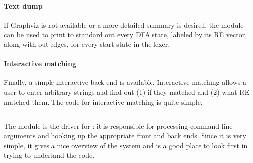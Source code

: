 \paragraph{Text dump}

If Graphviz is not available or a more detailed summary is desired, the
 module can be used to print to standard out every DFA state,
labeled by its RE vector, along with out-edges, for every start state in the
lexer.

\paragraph{Interactive matching}

Finally, a simple interactive back end is available.  Interactive matching
allows a user to enter arbitrary strings and find out (1) if they matched and
(2) what RE matched them.  The code for interactive matching is quite simple.

\subsection{}

The  module is the driver for \flex{}: it is responsible for processing
command-line arguments and hooking up the appropriate front and back ends. 
Since it is very simple, it gives a nice overview of the system and is a good
place to look first in trying to undertand the code.






